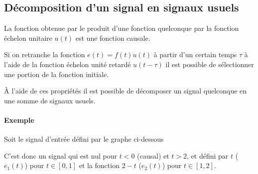 \subsection{Décomposition d'un signal en signaux usuels
\label{subsec:decomp_usuels}}
La fonction obtenue par le produit d'une fonction quelconque 
par la fonction échelon unitaire $u(t)$ est une fonction causale.
\begin{center}
    
\end{center}
Si on retranche la fonction $e(t)=f(t)u(t)$ à partir d'un certain temps
$\tau$ à l'aide de la fonction échelon unité retardé $u(t-\tau)$ 
il est possible de sélectionner une portion de la fonction initiale.
\begin{center}
    
\end{center}
\`A l'aide de ces propriétés il est possible de décomposer un signal 
quelconque en une somme de signaux usuels.
\paragraph{Exemple}
Soit le signal d'entrée défini par le graphe ci-dessous
\begin{center}
    
\end{center}
C'est donc un signal qui est nul pour $t<0$ (causal) et $t>2$, et défini
par $t$ ($e_1(t)$) pour $t\in[0,1]$ et la fonction $2-t$ ($e_2(t)$) pour 
$t\in[1,2]$. 


